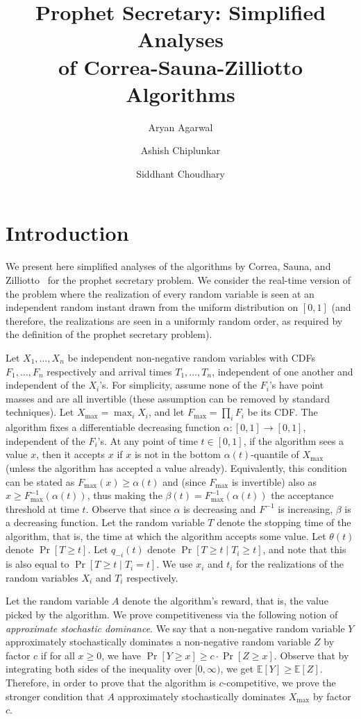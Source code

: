 \documentclass[10pt, letterpaper, twoside]{article}
\title{Prophet Secretary: Simplified Analyses\\ of Correa-Sauna-Zilliotto Algorithms}
\author{Aryan Agarwal \and Ashish Chiplunkar \and Siddhant Choudhary}
\date{}
\begin{document}
\maketitle

\section{Introduction}

We present here simplified analyses of the algorithms by Correa, Sauna, and Zilliotto~\cite{CorreaSZ19} for the prophet secretary problem. We consider the real-time version of the problem where the realization of every random variable is seen at an independent random instant drawn from the uniform distribution on $[0,1]$ (and therefore, the realizations are seen in a uniformly random order, as required by the definition of the prophet secretary problem).

Let $X_1,\ldots,X_n$ be independent non-negative random variables with CDFs $F_1,\ldots,F_n$ respectively and arrival times $T_1,\ldots,T_n$, independent of one another and independent of the $X_i$'s. For simplicity, assume none of the $F_i$'s have point masses and are all invertible (these assumption can be removed by standard techniques). Let $X_{\max}=\max_iX_i$, and let $F_{\max}=\prod_iF_i$ be its CDF. The algorithm fixes a differentiable decreasing function $\alpha:[0,1]\longrightarrow[0,1]$, independent of the $F_i$'s. At any point of time $t\in[0,1]$, if the algorithm sees a value $x$, then it accepts $x$ if $x$ is not in the bottom $\alpha(t)$-quantile of $X_{\max}$ (unless the algorithm has accepted a value already). Equivalently, this condition can be stated as $F_{\max}(x)\geq\alpha(t)$ and (since $F_{\max}$ is invertible) also as $x\geq F_{\max}^{-1}(\alpha(t))$, thus making the $\beta(t)=F_{\max}^{-1}(\alpha(t))$ the acceptance threshold at time $t$. Observe that since $\alpha$ is decreasing and $F^{-1}$ is increasing, $\beta$ is a decreasing function. Let the random variable $T$ denote the stopping time of the algorithm, that is, the time at which the algorithm accepts some value. Let $\theta(t)$ denote $\Pr[T\geq t]$. Let $q_{-i}(t)$ denote $\Pr[T\geq t\mid T_i\geq t]$, and note that this is also equal to $\Pr[T\geq t\mid T_i=t]$. We use $x_i$ and $t_i$ for the realizations of the random variables $X_i$ and $T_i$ respectively.

Let the random variable $A$ denote the algorithm's reward, that is, the value picked by the algorithm. We prove competitiveness via the following notion of \textit{approximate stochastic dominance}. We say that a non-negative random variable $Y$ approximately stochastically dominates a non-negative random variable $Z$ by factor $c$ if for all $x\geq0$, we have $\Pr[Y\geq x]\geq c\cdot\Pr[Z\geq x]$. Observe that by integrating both sides of the inequality over $[0,\infty)$, we get $\mathbb{E}[Y]\geq\mathbb{E}[Z]$. Therefore, in order to prove that the algorithm is $c$-competitive, we prove the stronger condition that $A$ approximately stochastically dominates $X_{\max}$ by factor $c$.
\end{document}
